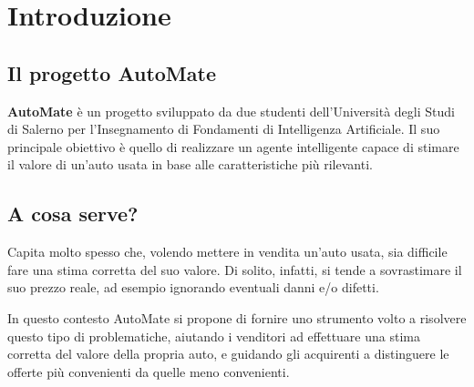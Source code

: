 \chapter{Introduzione}
\section{Il progetto AutoMate}
\textbf{AutoMate} è un progetto sviluppato da due studenti dell'Università degli Studi di Salerno per l'Insegnamento 
di Fondamenti di Intelligenza Artificiale. Il suo principale obiettivo è quello di realizzare un agente intelligente capace di 
stimare il valore di un'auto usata in base alle caratteristiche più rilevanti.
\medskip
\section{A cosa serve?}
Capita molto spesso che, volendo mettere in vendita un'auto usata, sia difficile fare una stima corretta del suo valore. 
Di solito, infatti, si tende a sovrastimare il suo prezzo reale, ad esempio ignorando eventuali danni e/o difetti.

In questo contesto AutoMate si propone di fornire uno strumento volto a risolvere questo tipo di problematiche, 
aiutando i venditori ad effettuare una stima corretta del valore della propria auto, e guidando gli acquirenti a distinguere 
le offerte più convenienti da quelle meno convenienti.
